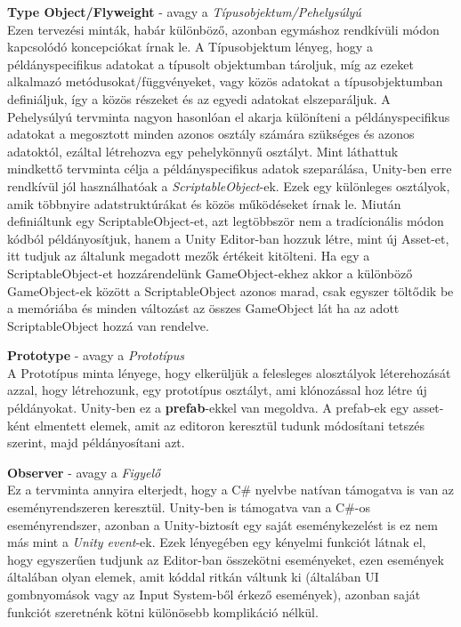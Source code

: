 \textbf{Type Object/Flyweight} - avagy a \textit{Típusobjektum/Pehelysúlyú}\\
Ezen tervezési minták, habár különböző, azonban egymáshoz rendkívüli módon kapcsolódó koncepciókat írnak le. A Típusobjektum lényeg, hogy a példányspecifikus adatokat a típusolt objektumban tároljuk, míg az ezeket alkalmazó metódusokat/függvényeket, vagy közös adatokat a típusobjektumban definiáljuk, így a közös részeket és az egyedi adatokat elszeparáljuk. A Pehelysúlyú tervminta nagyon hasonlóan el akarja különíteni a példányspecifikus adatokat a megosztott minden azonos osztály számára szükséges és azonos adatoktól, ezáltal létrehozva egy pehelykönnyű osztályt. Mint láthattuk mindkettő tervminta célja a példányspecifikus adatok szeparálása, Unity-ben erre rendkívül jól használhatóak a \textit{ScriptableObject}-ek. Ezek egy különleges osztályok, amik többnyire adatstruktúrákat és közös működéseket írnak le. Miután definiáltunk egy ScriptableObject-et, azt legtöbbször nem a tradícionális módon kódból példányosítjuk, hanem a Unity Editor-ban hozzuk létre, mint új Asset-et, itt tudjuk az általunk megadott mezők értékeit kitölteni. Ha egy a ScriptableObject-et hozzárendelünk GameObject-ekhez akkor a különböző GameObject-ek között a ScriptableObject azonos marad, csak egyszer töltődik be a memóriába és minden változást az összes GameObject lát ha az adott ScriptableObject hozzá van rendelve.

\textbf{Prototype} - avagy a \textit{Prototípus}\\
A Prototípus minta lényege, hogy elkerüljük a felesleges alosztályok léterehozását azzal, hogy létrehozunk, egy prototípus osztályt, ami klónozással hoz létre új példányokat. Unity-ben ez a \textbf{prefab}-ekkel van megoldva. A prefab-ek egy asset-ként elmentett elemek, amit az editoron keresztül tudunk módosítani tetszés szerint, majd példányosítani azt. 

\textbf{Observer} - avagy a \textit{Figyelő}\\
Ez a tervminta annyira elterjedt, hogy a C\# nyelvbe natívan támogatva is van az eseményrendszeren keresztül. Unity-ben is támogatva van a C\#-os eseményrendszer, azonban a Unity-biztosít egy saját eseménykezelést is ez nem más mint a \textit{Unity event}-ek. Ezek lényegében egy kényelmi funkciót látnak el, hogy egyszerűen tudjunk az Editor-ban összekötni eseményeket, ezen események általában olyan elemek, amit kóddal ritkán váltunk ki (általában UI gombnyomások vagy az Input System-ből érkező események), azonban saját funkciót szeretnénk kötni különösebb komplikáció nélkül.

